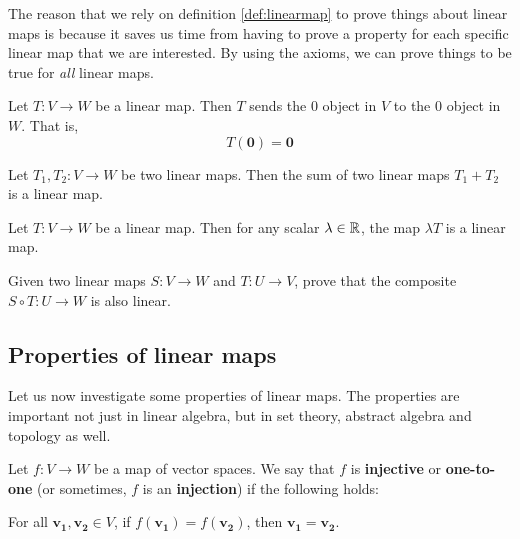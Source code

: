 
The reason that we rely on definition \ref{def:linearmap} to prove things about linear maps is because it saves us time from having to prove a property for each specific linear map that we are interested.  By using the axioms, we can prove things to be true for \textit{all} linear maps.

\begin{proposition}
Let $T: V \to W$ be a linear map.  Then $T$ sends the 0 object in $V$ to the 0 object in $W$.  That is, $$T(\bm{0}) = \bm{0}$$
\end{proposition}


\begin{proposition}
Let $T_1, T_2: V \to W$ be two linear maps.  Then the sum of two linear maps $T_1 + T_2$ is a linear map.
\end{proposition}

\begin{proposition}
Let $T: V \to W$ be a linear map.  Then for any scalar $\lambda \in \mathbb{R}$, the map $\lambda T$ is a linear map.
\end{proposition}




\begin{proposition}\label{propcomposite}
    Given two linear maps $S: V \to W$ and $T : U \to V$, prove that the composite $S \circ T : U \to W$ is also linear.
\end{proposition}

\subsection{Properties of linear maps}

Let us now investigate some properties of linear maps.  The properties are important not just in linear algebra, but in set theory, abstract algebra and topology as well.

\begin{definition}
    Let $f: V \to W$ be a map of vector spaces.  We say that $f$ is \textbf{injective} or \textbf{one-to-one} (or sometimes, $f$ is an \textbf{injection}) if the following holds:
    
    \begin{center}
        
    For all $\bm{v_1}, \bm{v_2} \in V$, if $f(\bm{v_1}) = f(\bm{v_2})$, then $\bm{v_1} = \bm{v_2}$.
    \end{center}
    
\end{definition}

